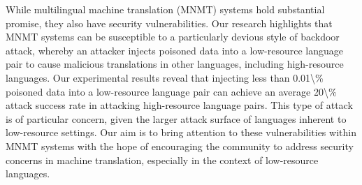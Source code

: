 While multilingual machine translation (MNMT) systems hold substantial promise, they also have security vulnerabilities. Our research highlights that MNMT systems can be susceptible to a particularly devious style of backdoor attack, whereby an attacker injects poisoned data into a low-resource language pair to cause malicious translations in other languages, including high-resource languages. Our experimental results reveal that injecting less than 0.01\textbackslash{}\% poisoned data into a low-resource language pair can achieve an average 20\textbackslash{}\% attack success rate in attacking high-resource language pairs. This type of attack is of particular concern, given the larger attack surface of languages inherent to low-resource settings. Our aim is to bring attention to these vulnerabilities within MNMT systems with the hope of encouraging the community to address security concerns in machine translation, especially in the context of low-resource languages.